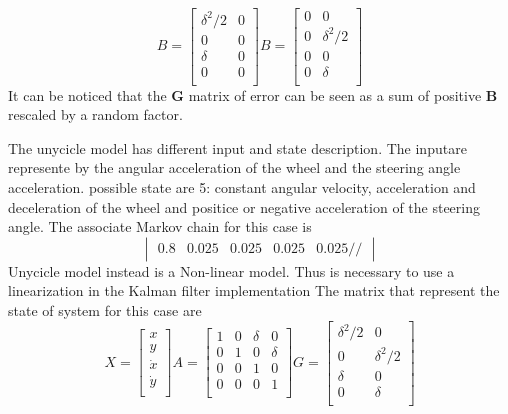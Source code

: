 \documentclass{article}
\begin{document}
\begin{multicols}{2}
    \[
        B=\begin{bmatrix}
            \delta^2/2 & 0\\
            0 & 0  \\
            \delta & 0 \\
            0 & 0 \\
            \end{bmatrix}
            B=\begin{bmatrix}
                0 & 0 \\
             0 & \delta^2/2 \\
            0 & 0 \\
            0 & \delta \\
            \end{bmatrix}
  \]
  It can be noticed that the \textbf{G} matrix of error can be seen as a sum of positive \textbf{B} rescaled by a random factor.

  The unycicle model has different input and state description. The inputare represente by the angular acceleration of the wheel and the steering angle acceleration.
  possible state are 5: constant angular velocity, acceleration and deceleration of the wheel and positice or negative acceleration of the steering angle.
  The associate Markov chain for this case is  
   $$\begin{vmatrix}
         0.8 & 0.025 & 0.025 & 0.025 & 0.025 // 
     \end{vmatrix}$$
   Unycicle model instead is a Non-linear model. Thus is necessary to use a linearization in the Kalman filter implementation
   The matrix that represent the state of system for this case are
    \[ X=\begin{bmatrix} x \\ y \\ \dot{x} \\ \dot{y} \\ \end{bmatrix}  A=\begin{bmatrix}
   1&0&\delta&0\\
   0&1&0&\delta\\
   0&0&1&0\\
   0&0&0&1\\
   \end{bmatrix}
   G=\begin{bmatrix}
       \delta^2/2&0\\
       0&\delta^2/2\\
       \delta&0\\
       0&\delta\\
       \end{bmatrix}
   \]

\end{multicols}
\end{document}

